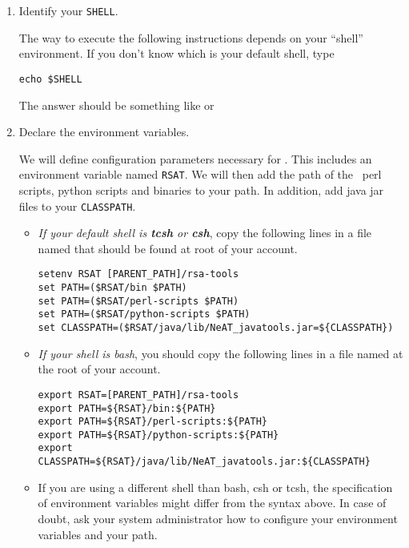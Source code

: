 \begin{enumerate}

\item Identify your \texttt{SHELL}.

  The way to execute the following instructions depends on your
  ``shell'' environment. If you don't know which is your default
  shell, type

\lstset{language=csh}

\begin{lstlisting}
echo $SHELL
\end{lstlisting}

The answer should be something like  or

\item Declare the \RSAT environment variables.

  We will define configuration parameters necessary for \RSAT.  This
  includes an environment variable named \texttt{RSAT}.  We will then
  add the path of the \RSAT \ perl scripts, python scripts and
  binaries to your path. In addition, add java jar files to your
  \texttt{CLASSPATH}.

\begin{itemize}

\item \emph{If your default shell is \textbf{tcsh} or \textbf{csh}},
  copy the following lines in a file named  that should
  be found at root of your account.

\begin{lstlisting}
setenv RSAT [PARENT_PATH]/rsa-tools
set PATH=($RSAT/bin $PATH)
set PATH=($RSAT/perl-scripts $PATH)
set PATH=($RSAT/python-scripts $PATH)
set CLASSPATH=($RSAT/java/lib/NeAT_javatools.jar=${CLASSPATH})
\end{lstlisting}

\item \emph{If your shell is bash}, you should copy the following lines in a
file named  at the root of your account.

\begin{lstlisting}
export RSAT=[PARENT_PATH]/rsa-tools
export PATH=${RSAT}/bin:${PATH}
export PATH=${RSAT}/perl-scripts:${PATH}
export PATH=${RSAT}/python-scripts:${PATH}
export CLASSPATH=${RSAT}/java/lib/NeAT_javatools.jar:${CLASSPATH}
\end{lstlisting}


\item If you are using a different shell than bash, csh or tcsh, the
specification of environment variables might differ from the syntax
above.  In case of doubt, ask your system administrator how to
configure your environment variables and your path.


\end{itemize}
\end{enumerate}
